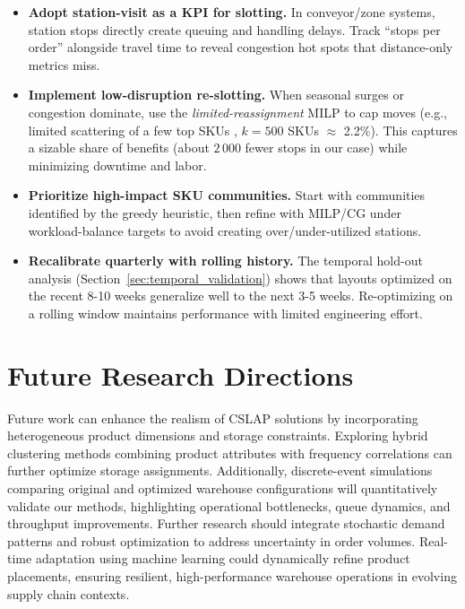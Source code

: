 \documentclass[11pt]{elsarticle}
\begin{document}
\begin{itemize}
    \item \textbf{Adopt station-visit as a KPI for slotting.} In conveyor/zone systems, station stops directly create queuing and handling delays. Track ``stops per order'' alongside travel time to reveal congestion hot spots that distance-only metrics miss.
    \item \textbf{Implement low-disruption re-slotting.} When seasonal surges or congestion dominate, use the \emph{limited-reassignment} MILP to cap moves (e.g., limited scattering of a few top SKUs \citep{liu2023scattered}, $k{=}500$ SKUs $\approx$ 2.2\%). This captures a sizable share of benefits (about $2\,000$ fewer stops in our case) while minimizing downtime and labor.
    \item \textbf{Prioritize high-impact SKU communities.} Start with communities identified by the greedy heuristic, then refine with MILP/CG under workload-balance targets to avoid creating over/under-utilized stations.
    \item \textbf{Recalibrate quarterly with rolling history.} The temporal hold-out analysis (Section~\ref{sec:temporal_validation}) shows that layouts optimized on the recent 8-10 weeks generalize well to the next 3-5 weeks. Re-optimizing on a rolling window maintains performance with limited engineering effort.
\end{itemize}


\section {Future Research Directions}
Future work can enhance the realism of CSLAP solutions by incorporating heterogeneous product dimensions and storage constraints. Exploring hybrid clustering methods combining product attributes with frequency correlations can further optimize storage assignments. Additionally, discrete-event simulations comparing original and optimized warehouse configurations will quantitatively validate our methods, highlighting operational bottlenecks, queue dynamics, and throughput improvements. 
Further research should integrate stochastic demand patterns and robust optimization to address uncertainty in order volumes. Real-time adaptation using machine learning could dynamically refine product placements, ensuring resilient, high-performance warehouse operations in evolving supply chain contexts.
\end{document}
